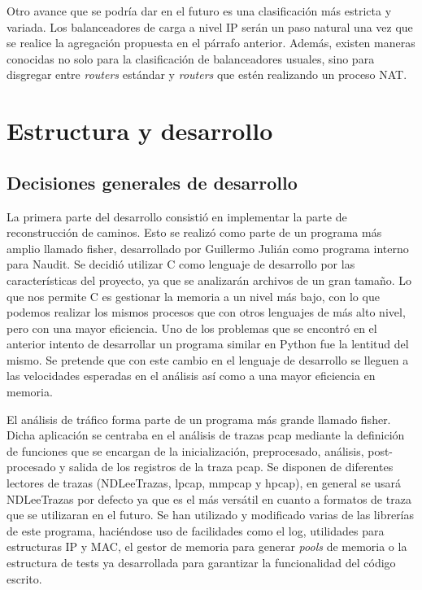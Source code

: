 \documentclass[twoside, 12pt]{epstfg}
\begin{document}
Otro avance que se podría dar en el futuro es una clasificación más estricta y variada. Los balanceadores de carga a nivel IP serán un paso natural una vez que se realice la agregación propuesta en el párrafo anterior. Además, existen maneras conocidas no solo para la clasificación de balanceadores usuales, sino para disgregar entre \textit{routers} estándar y \textit{routers} que estén realizando un proceso NAT.

\chapter{Estructura y desarrollo}
\label{chap:Desarrollo}
\section{Decisiones generales de desarrollo}

La primera parte del desarrollo consistió en implementar la parte de reconstrucción de caminos. Esto se realizó como parte de un programa más amplio llamado fisher, desarrollado por Guillermo Julián como programa interno para Naudit. Se decidió utilizar C como lenguaje de desarrollo por las características del proyecto, ya que se analizarán archivos de un gran tamaño. Lo que nos permite C es gestionar la memoria a un nivel más bajo, con lo que podemos realizar los mismos procesos que con otros lenguajes de más alto nivel, pero con una mayor eficiencia. Uno de los problemas que se encontró en el anterior intento de desarrollar un programa similar en Python fue la lentitud del mismo. Se pretende que con este cambio en el lenguaje de desarrollo se lleguen a las velocidades esperadas en el análisis así como a una mayor eficiencia en memoria.

El análisis de tráfico forma parte de un programa más grande llamado fisher. Dicha aplicación se centraba en el análisis de trazas pcap mediante la definición de funciones que se encargan de la inicialización, preprocesado, análisis, post-procesado y salida de los registros de la traza pcap. Se disponen de diferentes lectores de trazas (NDLeeTrazas, lpcap, mmpcap y hpcap), en general se usará NDLeeTrazas por defecto ya que es el más versátil en cuanto a formatos de traza que se utilizaran en el futuro. 
Se han utilizado y modificado varias de las librerías de este programa, haciéndose uso de facilidades como el log, utilidades para estructuras IP y MAC, el gestor de memoria para generar \textit{pools} de memoria o la estructura de tests ya desarrollada para garantizar la funcionalidad del código escrito.
\end{document}
